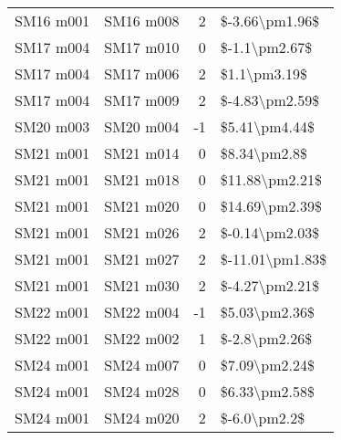 \begin{longtable}{llrl}
 SM16 m001 &     SM16 m008 &       2 &   \$-3.66\textbackslash pm1.96\$ \\
 SM17 m004 &     SM17 m010 &       0 &    \$-1.1\textbackslash pm2.67\$ \\
 SM17 m004 &     SM17 m006 &       2 &     \$1.1\textbackslash pm3.19\$ \\
 SM17 m004 &     SM17 m009 &       2 &   \$-4.83\textbackslash pm2.59\$ \\
 SM20 m003 &     SM20 m004 &      -1 &    \$5.41\textbackslash pm4.44\$ \\
 SM21 m001 &     SM21 m014 &       0 &     \$8.34\textbackslash pm2.8\$ \\
 SM21 m001 &     SM21 m018 &       0 &   \$11.88\textbackslash pm2.21\$ \\
 SM21 m001 &     SM21 m020 &       0 &   \$14.69\textbackslash pm2.39\$ \\
 SM21 m001 &     SM21 m026 &       2 &   \$-0.14\textbackslash pm2.03\$ \\
 SM21 m001 &     SM21 m027 &       2 &  \$-11.01\textbackslash pm1.83\$ \\
 SM21 m001 &     SM21 m030 &       2 &   \$-4.27\textbackslash pm2.21\$ \\
 SM22 m001 &     SM22 m004 &      -1 &    \$5.03\textbackslash pm2.36\$ \\
 SM22 m001 &     SM22 m002 &       1 &    \$-2.8\textbackslash pm2.26\$ \\
 SM24 m001 &     SM24 m007 &       0 &    \$7.09\textbackslash pm2.24\$ \\
 SM24 m001 &     SM24 m028 &       0 &    \$6.33\textbackslash pm2.58\$ \\
 SM24 m001 &     SM24 m020 &       2 &     \$-6.0\textbackslash pm2.2\$ \\
\end{longtable}

